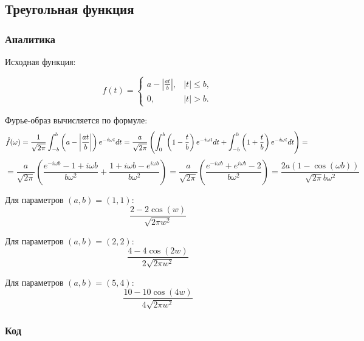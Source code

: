 \documentclass[a4paper,12pt]{article}
\begin{document}
\subsection{Треугольная функция}

\subsubsection{Аналитика}

Исходная функция:

\[
f(t) = 
\begin{cases} 
a - \left| \frac{a t}{b} \right|, & |t| \leq b, \\
0, & |t| > b.
\end{cases}
\]


Фурье-образ вычисляется по формуле:
\[
\hat{f}(\omega) = \frac{1}{\sqrt{2\pi}} \int_{-b}^{b} \left( a - \left| \frac{a t}{b} \right| \right) e^{-i\omega t} dt = \frac{a}{\sqrt{2\pi}} \left( \int_{0}^{b} \left( 1 - \frac{t}{b} \right) e^{-i\omega t} dt + \int_{-b}^{0} \left( 1 + \frac{t}{b} \right) e^{-i\omega t} dt \right) = \\
\]
\[
= \frac{a}{\sqrt{2\pi}} \left( \frac{e^{-i\omega b} - 1 + i\omega b}{b \omega^2} + \frac{1 + i\omega b - e^{i\omega b}}{b \omega^2} \right) = \frac{a}{\sqrt{2\pi}} \left( \frac{e^{-i\omega b} + e^{i\omega b} - 2}{b \omega^2} \right) = \frac{2a (1 - \cos(\omega b))}{\sqrt{2\pi} b \omega^2}
\]




Для параметров \( (a, b) = (1, 1) \):
\[
\frac{2 - 2 \cos (w)}{\sqrt{2 \pi w^2}}
\]

Для параметров \( (a, b) = (2, 2) \):
\[
\frac{4 - 4 \cos (2w)}{2\sqrt{2 \pi w^2}}
\]

Для параметров \( (a, b) = (5, 4) \):
\[
\frac{10 - 10 \cos (4w)}{4\sqrt{2 \pi w^2}}
\]


\subsubsection{Код}
\end{document}
